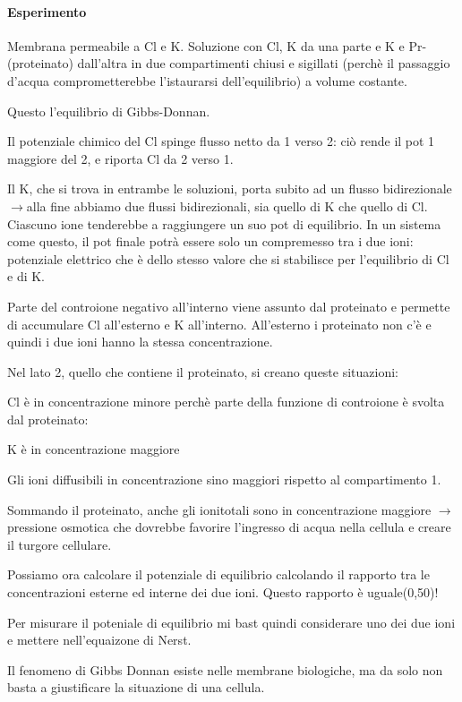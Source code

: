 \documentclass[a4paper,12pt]{article}
\newcommand{\lfreccia}{\ensuremath{\longrightarrow}}
\begin{document}
\paragraph{Esperimento}
Membrana permeabile a Cl e K. Soluzione con Cl, K  da una parte e K e Pr- (proteinato) dall’altra in due compartimenti chiusi e sigillati (perchè il passaggio d’acqua comprometterebbe l’istaurarsi dell’equilibrio) a volume costante.

Questo  l’equilibrio di Gibbs-Donnan.

Il potenziale chimico del Cl spinge flusso netto da 1 verso 2: ciò rende il pot 1 maggiore del 2, e riporta Cl da 2 verso 1.

Il K, che si trova in entrambe le soluzioni, porta subito ad un flusso bidirezionale \lfreccia alla fine abbiamo due flussi bidirezionali, sia quello di K che quello di Cl. Ciascuno ione tenderebbe a raggiungere un suo pot di equilibrio. In un sistema come questo, il pot finale potrà essere solo un compremesso tra i due ioni: potenziale elettrico che è dello stesso valore che si stabilisce per l’equilibrio di Cl e di K.

Parte del controione negativo all’interno viene assunto dal proteinato e permette di accumulare Cl all’esterno e K all’interno. All’esterno i proteinato non c’è e quindi i due ioni hanno la stessa concentrazione.

Nel lato 2, quello che contiene il proteinato, si creano queste situazioni:

Cl è in concentrazione minore perchè parte della funzione di controione è svolta dal proteinato:

K è in concentrazione maggiore

Gli ioni diffusibili in concentrazione sino maggiori rispetto al compartimento 1.

Sommando il proteinato, anche gli ionitotali sono in concentrazione maggiore \lfreccia pressione osmotica che dovrebbe favorire l’ingresso di acqua nella cellula e creare il turgore cellulare.

Possiamo ora calcolare il potenziale di equilibrio calcolando il rapporto tra le concentrazioni esterne ed interne dei due ioni. Questo rapporto è uguale(0,50)!

Per misurare il poteniale di equilibrio mi bast quindi considerare uno dei due ioni e mettere nell’equaizone di Nerst.

Il fenomeno di Gibbs Donnan esiste nelle membrane biologiche, ma da solo non basta a giustificare la situazione di una cellula.
\end{document}
